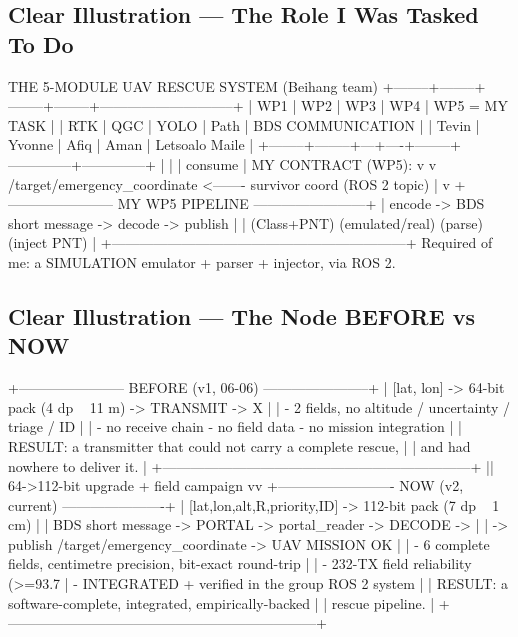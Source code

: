 \documentclass[11pt,a4paper]{article}
\begin{document}
\subsection{Clear Illustration --- The Role I Was Tasked To Do}
\begin{ascii}
                THE 5-MODULE UAV RESCUE SYSTEM (Beihang team)
   +--------+--------+--------+--------+-----------------------------+
   |  WP1   |  WP2   |  WP3   |  WP4   |      WP5  =  MY TASK        |
   |  RTK   |  QGC   |  YOLO  |  Path  |   BDS COMMUNICATION         |
   | Tevin  | Yvonne |  Afiq  |  Aman  |      Letsoalo Maile         |
   +--------+--------+---+----+--------+--------------+--------------+
                         |                            |
                         |  consume                   | MY CONTRACT (WP5):
                         v                            v
        /target/emergency_coordinate  <-------  survivor coord
                  (ROS 2 topic)                     |
                                                    v
        +----------------------- MY WP5 PIPELINE ------------------------+
        |  encode  ->  BDS short message  ->  decode  ->  publish        |
        |  (Class+PNT)     (emulated/real)     (parse)    (inject PNT)   |
        +---------------------------------------------------------------+
   Required of me: a SIMULATION emulator + parser + injector, via ROS 2.
\end{ascii}

\subsection{Clear Illustration --- The Node BEFORE vs NOW}
\begin{ascii}
  +----------------------- BEFORE (v1, 06-06) -----------------------+
  |  [lat, lon]  ->  64-bit pack (4 dp ~ 11 m)  ->  TRANSMIT  ->  X   |
  |  - 2 fields, no altitude / uncertainty / triage / ID             |
  |  - no receive chain   - no field data   - no mission integration |
  |  RESULT: a transmitter that could not carry a complete rescue,   |
  |          and had nowhere to deliver it.                          |
  +------------------------------------------------------------------+
                                 ||  64->112-bit upgrade + field campaign
                                 vv
  +------------------------- NOW (v2, current) ----------------------+
  |  [lat,lon,alt,R,priority,ID] -> 112-bit pack (7 dp ~ 1 cm)       |
  |   BDS short message -> PORTAL -> portal_reader -> DECODE ->      |
  |       -> publish /target/emergency_coordinate -> UAV MISSION OK  |
  |  - 6 complete fields, centimetre precision, bit-exact round-trip |
  |  - 232-TX field reliability (>=93.7%
  |  - INTEGRATED + verified in the group ROS 2 system               |
  |  RESULT: a software-complete, integrated, empirically-backed     |
  |          rescue pipeline.                                        |
  +------------------------------------------------------------------+
\end{ascii}
\end{document}

